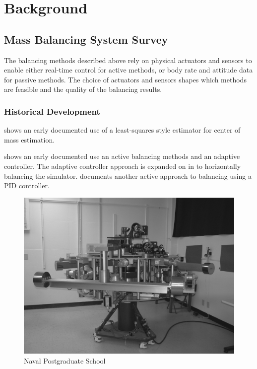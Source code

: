 \chapter{Background}\label{chap:background}

 
\section{Mass Balancing System Survey}

The balancing methods described above rely on physical actuators and sensors to enable either real-time control for active methods, or body rate and attitude data for passive methods. The choice of actuators and sensors shapes which methods are feasible and the quality of the balancing results.

\subsection{Historical Development}

\cite{young1998development} shows an early documented use of a least-squares style estimator for center of mass estimation.

\cite{kim_automatic_2009} shows an early documented use an active balancing methods and an adaptive controller. The adaptive controller approach is expanded on in \cite{chesi_automatic_2014} to horizontally balancing the simulator. \cite{choi_automatic_2016} documents another active approach to balancing using a PID controller. 

\begin{figure}[h]
    \centering
    \includegraphics[width=0.70\linewidth]{figures/NPS.png}
    \caption{Naval Postgraduate School}
    \label{fig:NPS}
\end{figure}

